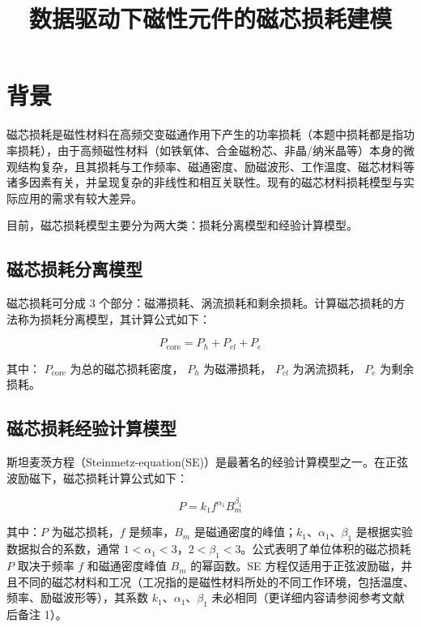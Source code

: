 \documentclass[a4paper,12pt]{ctexart}
\title{数据驱动下磁性元件的磁芯损耗建模}
\author{}
\date{}
\begin{document}
\maketitle

\section{背景}

磁芯损耗是磁性材料在高频交变磁通作用下产生的功率损耗（本题中损耗都是指功率损耗），由于高频磁性材料（如铁氧体、合金磁粉芯、非晶/纳米晶等）本身的微观结构复杂，且其损耗与工作频率、磁通密度、励磁波形、工作温度、磁芯材料等诸多因素有关，并呈现复杂的非线性和相互关联性。现有的磁芯材料损耗模型与实际应用的需求有较大差异。

目前，磁芯损耗模型主要分为两大类：损耗分离模型和经验计算模型。

\subsection{磁芯损耗分离模型}
磁芯损耗可分成 3 个部分：磁滞损耗、涡流损耗和剩余损耗。计算磁芯损耗的方法称为损耗分离模型，其计算公式如下：

\begin{equation}
P_{\text{core}} = P_h + P_{cl} + P_e
\end{equation}

其中： $P_{\text{core}}$ 为总的磁芯损耗密度， $P_h$ 为磁滞损耗， $P_{cl}$ 为涡流损耗， $P_e$ 为剩余损耗。

\subsection{磁芯损耗经验计算模型}

斯坦麦茨方程（Steinmetz-equation(SE)）是最著名的经验计算模型之一。在正弦波励磁下，磁芯损耗计算公式如下：

\begin{equation}
P = k_1 f^{\alpha_1} B_m^{\beta_1}
\end{equation}

其中：$P$ 为磁芯损耗，$f$ 是频率，$B_m$ 是磁通密度的峰值；$k_1$、$\alpha_1$、$\beta_1$ 是根据实验数据拟合的系数，通常 $1<\alpha_1<3$，$2<\beta_1<3$。公式表明了单位体积的磁芯损耗 $P$ 取决于频率 $f$ 和磁通密度峰值 $B_m$ 的幂函数。SE 方程仅适用于正弦波励磁，并且不同的磁芯材料和工况（工况指的是磁性材料所处的不同工作环境，包括温度、频率、励磁波形等），其系数 $k_1$、$\alpha_1$、$\beta_1$ 未必相同（更详细内容请参阅参考文献后备注 1）。
\end{document}
